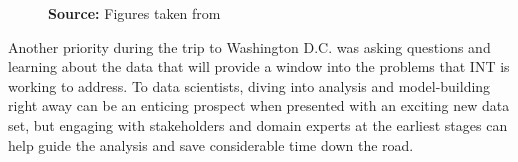 \begin{figure}[H]
\begin{subfigure}[t]{0.5\textwidth}
\end{subfigure}
\footnotesize{\textbf{Source:} Figures taken from \cite{wb_poster}}
\end{figure}

Another priority during the trip to Washington D.C. was asking questions and learning about the data that will provide a window into the problems that INT is working to address. To data scientists, diving into analysis and model-building right away can be an enticing prospect when presented with an exciting new data set, but engaging with stakeholders and domain experts at the earliest stages can help guide the analysis and save considerable time down the road.






